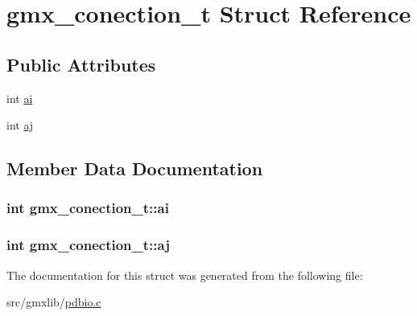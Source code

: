 \hypertarget{structgmx__conection__t}{\section{gmx\-\_\-conection\-\_\-t \-Struct \-Reference}
\label{structgmx__conection__t}
}
\subsection*{\-Public \-Attributes}
\begin{DoxyCompactItemize}
\item 
int \hyperlink{structgmx__conection__t_aa9780f70a62824513fe72e7880755014}{ai}
\item 
int \hyperlink{structgmx__conection__t_a9658c0f4b4d7b9f62f5837f082f93d73}{aj}
\end{DoxyCompactItemize}


\subsection{\-Member \-Data \-Documentation}
\hypertarget{structgmx__conection__t_aa9780f70a62824513fe72e7880755014}{
\subsubsection[{ai}]{\setlength{\rightskip}{0pt plus 5cm}int {\bf gmx\-\_\-conection\-\_\-t\-::ai}}}\label{structgmx__conection__t_aa9780f70a62824513fe72e7880755014}
\hypertarget{structgmx__conection__t_a9658c0f4b4d7b9f62f5837f082f93d73}{
\subsubsection[{aj}]{\setlength{\rightskip}{0pt plus 5cm}int {\bf gmx\-\_\-conection\-\_\-t\-::aj}}}\label{structgmx__conection__t_a9658c0f4b4d7b9f62f5837f082f93d73}


\-The documentation for this struct was generated from the following file\-:\begin{DoxyCompactItemize}
\item 
src/gmxlib/\hyperlink{pdbio_8c}{pdbio.\-c}\end{DoxyCompactItemize}
